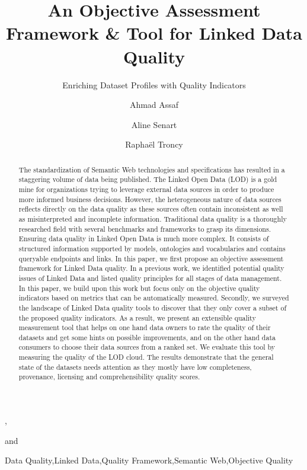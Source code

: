 \documentclass[onecolumn, crcready]{iosart2c}
\begin{document}
\begin{frontmatter}


\title{An Objective Assessment Framework \& Tool for Linked Data Quality}
\subtitle{Enriching Dataset Profiles with Quality Indicators}
\author[A,B]{Ahmad Assaf}, \author[A]{Aline Senart} and
\author[B]{Rapha\"{e}l Troncy}
\address[A]{SAP Research, SAP Labs France SAS,\\
805 avenue du Dr. Maurice Donat, BP 1216, 06254 Mougins Cedex, France\\
}
\address[B]{EURECOM,\\
2229 route des cretes, 06560 Sophia Antipolis, France\\
}


\begin{abstract}
The standardization of Semantic Web technologies and specifications has resulted in a staggering volume of data being published. The Linked Open Data (LOD) is a gold mine for organizations trying to leverage external data sources in order to produce more informed business decisions. However, the heterogeneous nature of data sources reflects directly on the data quality as these sources often contain inconsistent as well as misinterpreted and incomplete information. Traditional data quality is a thoroughly researched field with several benchmarks and frameworks to grasp its dimensions. Ensuring data quality in Linked Open Data is much more complex. It consists of structured information supported by models, ontologies and vocabularies and contains queryable endpoints and links. In this paper, we first propose an objective assessment framework for Linked Data quality. In a previous work, we identified potential quality issues of Linked Data and listed quality principles for all stages of data management. In this paper, we build upon this work but focus only on the objective quality indicators based on metrics that can be automatically measured. Secondly, we surveyed the landscape of Linked Data quality tools to discover that they only cover a subset of the proposed quality indicators. As a result, we present an extensible quality measurement tool that helps on one hand data owners to rate the quality of their datasets and get some hints on possible improvements, and on the other hand data consumers to choose their data sources from a ranked set. We evaluate this tool by measuring the quality of the LOD cloud. The results demonstrate that the general state of the datasets needs attention as they mostly have low completeness, provenance, licensing and comprehensibility quality scores.
\end{abstract}

\begin{keyword}
Data Quality\sep Linked Data\sep Quality Framework\sep Semantic Web\sep Objective Quality
\end{keyword}
\end{frontmatter}
\end{document}
